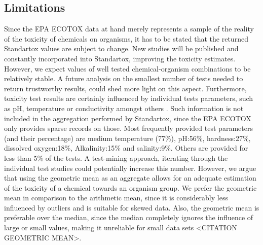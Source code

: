 \subsection*{Limitations}
Since the EPA ECOTOX data at hand merely represents a sample of the reality of the toxicity of chemicals on organisms, it has to be stated that the returned Standartox values are subject to change. New studies will be published and constantly incorporated into Standartox, improving the toxicity estimates. However, we expect values of well tested chemical-organism combinations to be relatively stable. A future analysis on the smallest number of tests needed to return trustworthy results, could shed more light on this aspect. Furthermore, toxicity test results are certainly influenced by individual tests parameters, such as pH, temperature or conductivity amongst others \citep{rosenkrantz_influence_2013, li_temperature_2011}. Such information is not included in the aggregation performed by Standartox, since the EPA ECOTOX only provides sparse records on those. Most frequently provided test parameters (and their percentage) are medium temperature (77\%), pH:56\%, hardness:27\%, dissolved oxygen:18\%, Alkalinity:15\% and salinity:9\%. Others are provided for less than 5\% of the tests. A test-mining approach, iterating through the individual test studies could potentially increase this number. However, we argue that using the geometric mean as an aggregate allows for an adequate estimation of the toxicity of a chemical towards an organism group. We prefer the geometric mean in comparison to the arithmetic mean, since it is considerably less influenced by outliers and is suitable for skewed data. Also, the geometric mean is preferable over the median, since the median completely ignores the influence of large or small values, making it unreliable for small data sets <CITATION GEOMETRIC MEAN>.

